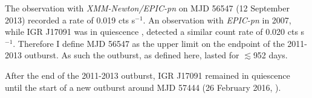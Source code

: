 \par The observation with \textit{XMM-Newton/EPIC-pn} on MJD 56547 (12 September 2013) recorded a rate of 0.019 cts s$^{-1}$.  An observation with \textit{EPIC-pn} in 2007, while IGR J17091 was in quiescence \citep{Wijnands_Quiescence}, detected a similar count rate of 0.020 cts s$^{-1}$.  Therefore I define MJD 56547 as the upper limit on the endpoint of the 2011-2013 outburst.  As such the outburst, as defined here, lasted for $\lesssim$952 days.
\par After the end of the 2011-2013 outburst, IGR J17091 remained in quiescence until the start of a new outburst around MJD 57444 (26 February 2016, \citealp{Miller_2016Outburst}).

\subsection{\rxte}


